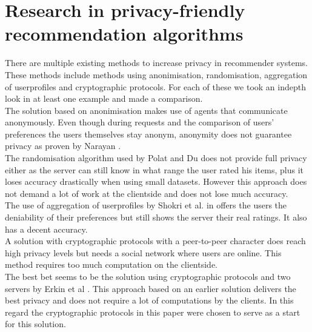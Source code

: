 \documentclass[twocolumn]{phdsymp} %
\begin{document}
\section{Research in privacy-friendly recommendation algorithms}
There are multiple existing methods to increase privacy in recommender systems. These methods include methods using anonimisation, randomisation, aggregation of userprofiles and cryptographic protocols. For each of these we took an indepth look in at least one example and made a comparison.\\The solution based on anonimisation \cite{anonimisatie} makes use of agents that communicate anonymously. Even though during requests and the comparison of users' preferences the users themselves stay anonym, anonymity does not guarantee privacy as proven by Narayan \cite{anon}.\\The randomisation algorithm used by Polat and Du \cite{rand} does not provide full privacy either as the server can still know in what range the user rated his items, plus it loses accuracy drastically when using small datasets. However this approach does not demand a lot of work at the clientside and does not lose much accuracy.\\  The use of aggregation of userprofiles by Shokri et al. in \cite{agg} offers the users the deniability of their preferences but still shows the server their real ratings. It also has a decent accuracy.\\ A solution with cryptographic protocols with a peer-to-peer character does reach high privacy levels but needs a social network where users are online. This method requires too much computation on the clientside.\\ The best bet seems to be the solution using cryptographic protocols and two servers by Erkin et al \cite{dyn}. This approach based on an earlier solution \cite{erkin} delivers the best privacy and does not require a lot of computations by the clients. In this regard the cryptographic protocols in this paper were chosen to serve as a start for this solution.
\end{document}
